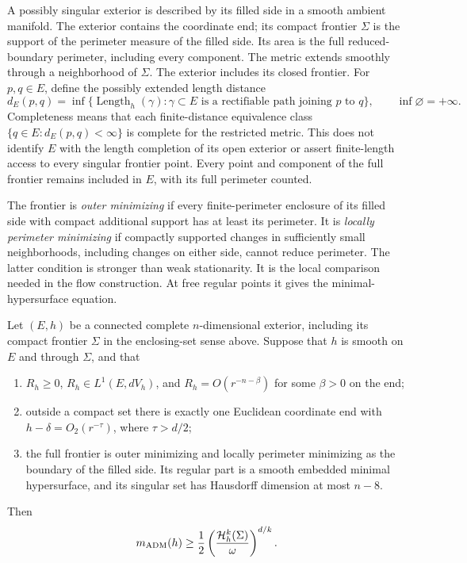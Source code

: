 A possibly singular exterior is described by its filled side in a
smooth ambient manifold. The exterior contains the coordinate end; its
compact frontier $\Sigma$ is the support of the perimeter measure of
the filled side. Its area is the full reduced-boundary perimeter,
including every component. The metric extends smoothly through a
neighborhood of $\Sigma$. The exterior includes its closed frontier.
For $p,q\in E$, define the possibly extended length distance
\[
 d_E(p,q)=\inf\{\operatorname{Length}_h(\gamma):
       \gamma\subset E\text{ is a rectifiable path joining }p\text{ to }q\},
 \qquad \inf\varnothing=+\infty.
\]
Completeness means that each finite-distance equivalence class
$\{q\in E:d_E(p,q)<\infty\}$ is complete for the restricted metric.
This does not identify $E$ with the length completion of its open
exterior or assert finite-length access to every singular frontier
point. Every point and component of the full frontier remains included
in $E$, with its full perimeter counted.

The frontier is \emph{outer minimizing} if every finite-perimeter
enclosure of its filled side with compact additional support has at
least its perimeter. It is \emph{locally perimeter minimizing} if
compactly supported changes in sufficiently small neighborhoods,
including changes on either side, cannot reduce perimeter. The latter
condition is stronger than weak stationarity. It is the local
comparison needed in the flow construction. At free regular points
it gives the minimal-hypersurface equation.

\begin{theorem}
\label{thm:rpi}
Let $(E,h)$ be a connected complete $n$-dimensional exterior, including
its compact frontier $\Sigma$ in the enclosing-set sense above. Suppose
that $h$ is smooth on $E$ and through $\Sigma$, and that
\begin{enumerate}
\item $R_h\ge0$, $R_h\in L^1(E,dV_h)$, and
      $R_h=O(r^{-n-\beta})$ for some $\beta>0$ on the end;
\item outside a compact set there is exactly one Euclidean coordinate
      end with $h-\delta=O_2(r^{-\tau})$, where $\tau>d/2$;
\item the full frontier is outer minimizing and locally perimeter
      minimizing as the boundary of the filled side. Its regular part
      is a smooth embedded minimal hypersurface, and its singular set
      has Hausdorff dimension at most $n-8$.
\end{enumerate}
Then
\begin{equation}\label{eq:rpi:numerical}
 m_{\rm ADM}(h)\ge\frac12
 \left(\frac{\mathcal H_h^k(\Sigma)}{\omega}\right)^{d/k}.
\end{equation}
\end{theorem}

